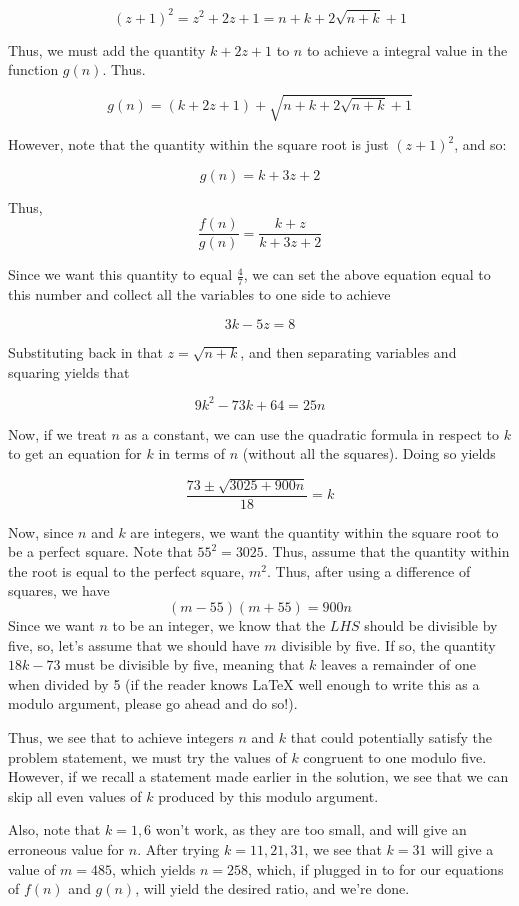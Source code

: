 \begin{enumerate}
 
 \[(z+1)^2=z^2+2z+1=n+k+2\sqrt{n+k}+1\]

 Thus, we must add the quantity $k+2z+1$ to $n$ to achieve a integral value in the function $g(n)$. Thus.

 
 \[g(n)=(k+2z+1)+\sqrt{n+k+2\sqrt{n+k}+1}\]

 However, note that the quantity within the square root is just $(z+1)^2$, and so:

 
 \[g(n)=k+3z+2\]

 Thus,
 \[\frac{f(n)}{g(n)}=\frac{k+z}{k+3z+2}\]

 Since we want this quantity to equal $\frac{4}{7}$, we can set the above equation equal to this number and collect all the variables to one side to achieve

 
 \[3k-5z=8\]

 Substituting back in that $z=\sqrt{n+k}$, and then separating variables and squaring yields that

 
 \[9k^2-73k+64=25n\]

 Now, if we treat $n$ as a constant, we can use the quadratic formula in respect to $k$ to get an equation for $k$ in terms of $n$ (without all the squares). Doing so yields

 
 \[\frac{73\pm\sqrt{3025+900n}}{18}=k\]

 Now, since $n$ and $k$ are integers, we want the quantity within the square root to be a perfect square. Note that $55^2=3025$. Thus, assume that the quantity within the root is equal to the perfect square, $m^2$. Thus, after using a difference of squares, we have
 \[(m-55)(m+55)=900n\]Since we want $n$ to be an integer, we know that the $LHS$ should be divisible by five, so, let's assume that we should have $m$ divisible by five. If so, the quantity $18k-73$ must be divisible by five, meaning that $k$ leaves a remainder of one when divided by 5 (if the reader knows LaTeX well enough to write this as a modulo argument, please go ahead and do so!). 

 Thus, we see that to achieve integers $n$ and $k$ that could potentially satisfy the problem statement, we must try the values of $k$ congruent to one modulo five. However, if we recall a statement made earlier in the solution, we see that we can skip all even values of $k$ produced by this modulo argument.

 Also, note that $k=1,6$ won't work, as they are too small, and will give an erroneous value for $n$. After trying $k=11,21,31$, we see that $k=31$ will give a value of $m=485$, which yields $n=\boxed{258}$, which, if plugged in to for our equations of $f(n)$ and $g(n)$, will yield the desired ratio, and we're done.


\end{enumerate}
